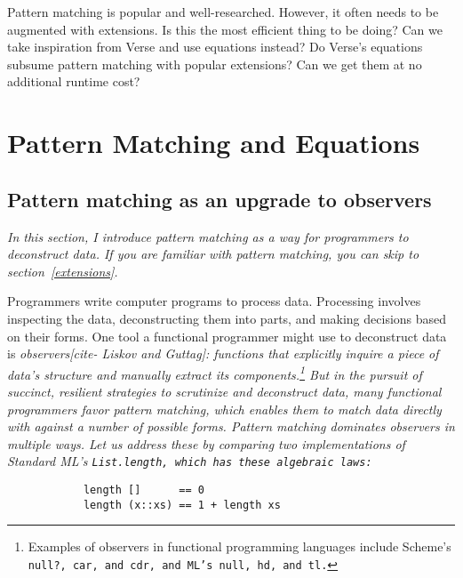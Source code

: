 \documentclass[manuscript,screen,review, 12pt]{acmart}
\begin{document}
Pattern matching is popular and well-researched. However, it often needs to be
augmented with extensions. Is this the most efficient thing to be doing? Can we
take inspiration from Verse and use equations instead? Do Verse's equations
subsume pattern matching with popular extensions? Can we get them at no
additional runtime cost? 


\section{Pattern Matching and Equations}
\label{pmandequations}
\subsection{Pattern matching as an upgrade to observers}
\label{pmoverobservers}

    
    

    \it{In this section, I introduce pattern matching as a way for programmers
    to deconstruct data. If you are familiar with pattern matching, you can skip
    to section~\ref{extensions}.}
    
    Programmers write computer programs to process data. Processing involves
    inspecting the data, deconstructing them into parts, and making decisions
    based on their forms. One tool a functional programmer might use to
    deconstruct data is \it{observers}[cite- Liskov and Guttag]: functions that
    explicitly inquire a piece of data's structure and manually extract its
    components.\footnote {Examples of observers in functional programming
    languages include Scheme's \tt{null?}, \tt{car}, and \tt{cdr}, and ML's
    \tt{null}, \tt{hd}, and \tt{tl}.} But in the pursuit of succinct, resilient
    strategies to scrutinize and deconstruct data, many functional programmers
    favor \it{pattern matching}, which enables them to match data directly with
    against a number of possible forms. Pattern matching dominates observers in
    multiple ways. Let us address these by comparing two implementations of
    Standard ML's \tt{List.length}, which has these algebraic laws: 

    \begin{minipage}[t]{\textwidth}
        \begin{verbatim}
            length []      == 0
            length (x::xs) == 1 + length xs 
        \end{verbatim}
    \end{minipage}
    
\end{document}
